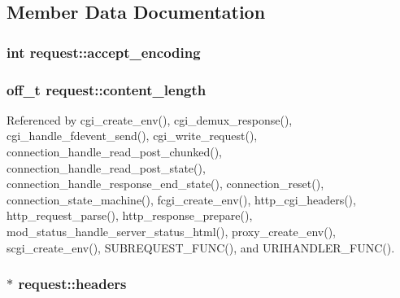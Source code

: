 \subsection{Member Data Documentation}
\hypertarget{structrequest_a114890880bc3afdcf97168f871106884}{
\subsubsection[{accept\-\_\-encoding}]{\setlength{\rightskip}{0pt plus 5cm}int request\-::accept\-\_\-encoding}}\label{structrequest_a114890880bc3afdcf97168f871106884}
\hypertarget{structrequest_addd1b722e8c980ee03f5a6339804c6d7}{
\subsubsection[{content\-\_\-length}]{\setlength{\rightskip}{0pt plus 5cm}off\-\_\-t request\-::content\-\_\-length}}\label{structrequest_addd1b722e8c980ee03f5a6339804c6d7}


Referenced by cgi\-\_\-create\-\_\-env(), cgi\-\_\-demux\-\_\-response(), cgi\-\_\-handle\-\_\-fdevent\-\_\-send(), cgi\-\_\-write\-\_\-request(), connection\-\_\-handle\-\_\-read\-\_\-post\-\_\-chunked(), connection\-\_\-handle\-\_\-read\-\_\-post\-\_\-state(), connection\-\_\-handle\-\_\-response\-\_\-end\-\_\-state(), connection\-\_\-reset(), connection\-\_\-state\-\_\-machine(), fcgi\-\_\-create\-\_\-env(), http\-\_\-cgi\-\_\-headers(), http\-\_\-request\-\_\-parse(), http\-\_\-response\-\_\-prepare(), mod\-\_\-status\-\_\-handle\-\_\-server\-\_\-status\-\_\-html(), proxy\-\_\-create\-\_\-env(), scgi\-\_\-create\-\_\-env(), S\-U\-B\-R\-E\-Q\-U\-E\-S\-T\-\_\-\-F\-U\-N\-C(), and U\-R\-I\-H\-A\-N\-D\-L\-E\-R\-\_\-\-F\-U\-N\-C().

\hypertarget{structrequest_ae04f8014a55574a32096fa362c96ba52}{
\subsubsection[{headers}]{$\ast$ request\-::headers}}\label{structrequest_ae04f8014a55574a32096fa362c96ba52}


